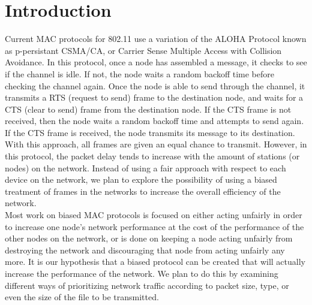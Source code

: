 \documentclass{sigcomm-alternate}
\begin{document}
\section{Introduction}
{
Current MAC protocols for 802.11 use a variation of the ALOHA Protocol known as p-persistant CSMA/CA, or Carrier Sense Multiple Access with Collision Avoidance. In this protocol, once a node has assembled a message, it checks to see if the channel is idle. If not, the node waits a random backoff time before checking the channel again. Once the node is able to send through the channel, it transmits a RTS (request to send) frame to the destination node, and waits for a CTS (clear to send) frame from the destination node. If the CTS frame is not received, then the node waits a random backoff time and attempts to send again. If the CTS frame is received, the node transmits its message to its destination. With this approach, all frames are given an equal chance to transmit. However, in this protocol, the packet delay tends to increase with the amount of stations (or nodes) on the network. Instead of using a fair approach with respect to each device on the network, we plan to explore the possibility of using a biased treatment of frames in the networks to increase the overall efficiency of the network.\\

Most work on biased MAC protocols is focused on either acting unfairly in order to increase one node's network performance at the cost of the performance of the other nodes on the network, or is done on keeping a node acting unfairly from destroying the network and discouraging that node from acting unfairly any more. It is our hypothesis that a biased protocol can be created that will actually increase the performance of the network. We plan to do this by examining different ways of prioritizing network traffic according to packet size, type, or even the size of the file to be transmitted. 
}
\end{document}
